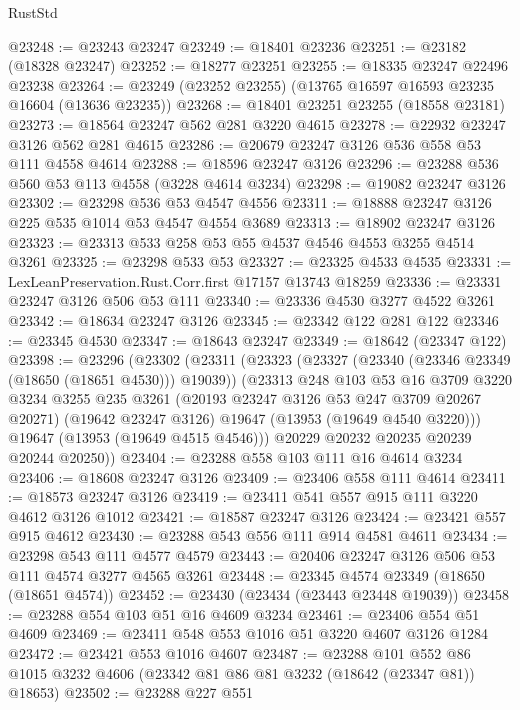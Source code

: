 \begin{lexlean}{RustStd}
\begin{coremodule}
@23248 := @23243 @23247
@23249 := @18401 @23236
@23251 := @23182 (@18328 @23247)
@23252 := @18277 @23251
@23255 := @18335 @23247 @22496 @23238
@23264 := @23249 (@23252 @23255) (@13765 @16597 @16593 @23235 @16604 (@13636 @23235))
@23268 := @18401 @23251 @23255 (@18558 @23181)
@23273 := @18564 @23247 @562 @281 @3220 @4615
@23278 := @22932 @23247 @3126 @562 @281 @4615
@23286 := @20679 @23247 @3126 @536 @558 @53 @111 @4558 @4614
@23288 := @18596 @23247 @3126
@23296 := @23288 @536 @560 @53 @113 @4558 (@3228 @4614 @3234)
@23298 := @19082 @23247 @3126
@23302 := @23298 @536 @53 @4547 @4556
@23311 := @18888 @23247 @3126 @225 @535 @1014 @53 @4547 @4554 @3689
@23313 := @18902 @23247 @3126
@23323 := @23313 @533 @258 @53 @55 @4537 @4546 @4553 @3255 @4514 @3261
@23325 := @23298 @533 @53
@23327 := @23325 @4533 @4535
@23331 := LexLeanPreservation.Rust.Corr.first @17157 @13743 @18259
@23336 := @23331 @23247 @3126 @506 @53 @111
@23340 := @23336 @4530 @3277 @4522 @3261
@23342 := @18634 @23247 @3126
@23345 := @23342 @122 @281 @122
@23346 := @23345 @4530
@23347 := @18643 @23247
@23349 := @18642 (@23347 @122)
@23398 := @23296
    (@23302
      (@23311
        (@23323
          (@23327 (@23340 (@23346 @23349 (@18650 (@18651 @4530))) @19039))
          (@23313
            @248
            @103
            @53
            @16
            @3709
            @3220
            @3234
            @3255
            @235
            @3261
            (@20193 @23247 @3126 @53 @247 @3709 @20267 @20271)
            (@19642 @23247 @3126)
            @19647
            (@13953 (@19649 @4540 @3220)))
          @19647
          (@13953 (@19649 @4515 @4546)))
        @20229
        @20232
        @20235
        @20239
        @20244
        @20250))
@23404 := @23288 @558 @103 @111 @16 @4614 @3234
@23406 := @18608 @23247 @3126
@23409 := @23406 @558 @111 @4614
@23411 := @18573 @23247 @3126
@23419 := @23411 @541 @557 @915 @111 @3220 @4612 @3126 @1012
@23421 := @18587 @23247 @3126
@23424 := @23421 @557 @915 @4612
@23430 := @23288 @543 @556 @111 @914 @4581 @4611
@23434 := @23298 @543 @111 @4577 @4579
@23443 := @20406 @23247 @3126 @506 @53 @111 @4574 @3277 @4565 @3261
@23448 := @23345 @4574 @23349 (@18650 (@18651 @4574))
@23452 := @23430 (@23434 (@23443 @23448 @19039))
@23458 := @23288 @554 @103 @51 @16 @4609 @3234
@23461 := @23406 @554 @51 @4609
@23469 := @23411 @548 @553 @1016 @51 @3220 @4607 @3126 @1284
@23472 := @23421 @553 @1016 @4607
@23487 := @23288
    @101
    @552
    @86
    @1015
    @3232
    @4606
    (@23342 @81 @86 @81 @3232 (@18642 (@23347 @81)) @18653)
@23502 := @23288
    @227
    @551

\end{coremodule}
\end{lexlean}
